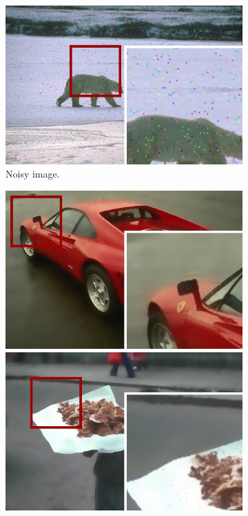 \begin{figure}[!ht]
\begin{subfigure}[]{0.22\textwidth}
    \includegraphics[width=\textwidth]{./figures/sensor/berkeley/100007_noisy_frame.jpg}%
    \caption{Noisy image.}
  \end{subfigure}\hfill
  \begin{subfigure}[]{0.22\textwidth}
    \centering
    \includegraphics[width=\textwidth]{./figures/sensor/berkeley/29030_bilateral_frame.jpg}\vspace{0.1cm}\\
    \includegraphics[width=\textwidth]{./figures/sensor/berkeley/90076_bilateral_frame.jpg}\vspace{0.1cm}\\

\end{subfigure}
\end{figure}
